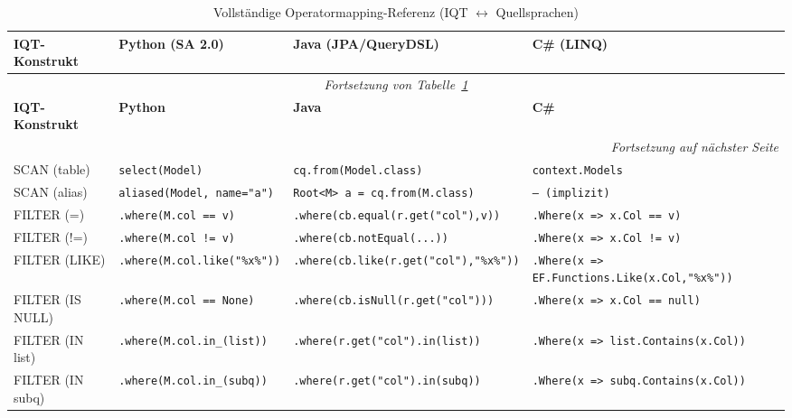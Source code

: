 \begin{landscape}
\scriptsize
\begin{longtable}{p{4.5cm}p{5.5cm}p{5.5cm}p{5.5cm}}
\caption{Vollständige Operatormapping-Referenz (IQT $\leftrightarrow$ Quellsprachen)}
\label{tab:full_mapping} \\
\toprule
\textbf{IQT-Konstrukt} & \textbf{Python (SA 2.0)} & \textbf{Java (JPA/QueryDSL)} & \textbf{C\# (LINQ)} \\
\midrule
\endfirsthead
\multicolumn{4}{c}{\small\itshape Fortsetzung von Tabelle~\ref{tab:full_mapping}} \\
\toprule
\textbf{IQT-Konstrukt} & \textbf{Python} & \textbf{Java} & \textbf{C\#} \\
\midrule
\endhead
\midrule
\multicolumn{4}{r}{\small\itshape Fortsetzung auf nächster Seite} \\
\endfoot
\bottomrule
\endlastfoot

SCAN (table)
  & \texttt{select(Model)}
  & \texttt{cq.from(Model.class)}
  & \texttt{context.Models} \\[4pt]

SCAN (alias)
  & \texttt{aliased(Model, name="a")}
  & \texttt{Root<M> a = cq.from(M.class)}
  & \texttt{-- (implizit)} \\[4pt]

FILTER (=)
  & \texttt{.where(M.col == v)}
  & \texttt{.where(cb.equal(r.get("col"),v))}
  & \texttt{.Where(x => x.Col == v)} \\[4pt]

FILTER (!=)
  & \texttt{.where(M.col != v)}
  & \texttt{.where(cb.notEqual(...))}
  & \texttt{.Where(x => x.Col != v)} \\[4pt]

FILTER (LIKE)
  & \texttt{.where(M.col.like("\%x\%"))}
  & \texttt{.where(cb.like(r.get("col"),"\%x\%"))}
  & \texttt{.Where(x => EF.Functions.Like(x.Col,"\%x\%"))} \\[4pt]

FILTER (IS NULL)
  & \texttt{.where(M.col == None)}
  & \texttt{.where(cb.isNull(r.get("col")))}
  & \texttt{.Where(x => x.Col == null)} \\[4pt]

FILTER (IN list)
  & \texttt{.where(M.col.in\_(list))}
  & \texttt{.where(r.get("col").in(list))}
  & \texttt{.Where(x => list.Contains(x.Col))} \\[4pt]

FILTER (IN subq)
  & \texttt{.where(M.col.in\_(subq))}
  & \texttt{.where(r.get("col").in(subq))}
  & \texttt{.Where(x => subq.Contains(x.Col))} \\[4pt]


\end{longtable}
\end{landscape}
